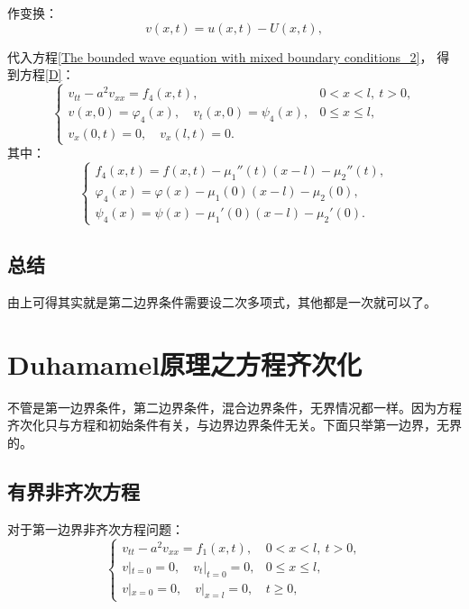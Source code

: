 \documentclass[12pt,a4paper]{article}
\numberwithin{subsection}{section}
\numberwithin{subsubsection}{subsection}
\theoremstyle{plain}
\theoremstyle{definition}
\theoremstyle{remark}
\begin{document}
	作变换：
	\begin{equation}
		v(x, t) = u(x, t) - U(x, t),
	\end{equation}
	
	代入方程\eqref{The bounded wave equation with mixed boundary conditions_2}，
	得到方程\eqref{D}：
	\begin{equation}\label{D}
		\begin{cases}
			v_{tt} - a^2 v_{xx} = f_4(x, t), & 0 < x < l, \ t > 0, \\
			v(x, 0) = \varphi_4(x), \quad v_t(x, 0) = \psi_4(x), & 0 \leq x \leq l, \\
			v_x(0, t) = 0, \quad v_x(l, t) = 0. &
		\end{cases}
	\end{equation}
	其中：
	\begin{equation}
		\begin{cases}
			f_4(x, t) = f(x, t) - \mu_1''(t) (x-l)- \mu_2''(t) , \\
			\varphi_4(x) = \varphi(x) - \mu_1(0)(x-l)- \mu_2(0), \\
			\psi_4(x) = \psi(x) - \mu_1'(0)(x-l) - \mu_2'(0).
		\end{cases}
	\end{equation}
	
	
	\subsection{总结}
	由上可得其实就是第二边界条件需要设二次多项式，其他都是一次就可以了。
	
	
	
		\newpage
	\section{Duhamamel原理之方程齐次化}
不管是第一边界条件，第二边界条件，混合边界条件，无界情况都一样。因为方程齐次化只与方程和初始条件有关，与边界边界条件无关。下面只举第一边界，无界的。
	
	
		\subsection{有界非齐次方程}

		
	对于第一边界非齐次方程问题：
	\begin{equation}
		\begin{cases}
			v_{tt} - a^2 v_{xx} = f_1(x, t), & 0 < x < l, \ t > 0, \\
			v|_{t=0} = 0, \quad v_t|_{t=0} = 0, & 0 \leq x \leq l, \\
			v|_{x=0} = 0, \quad v|_{x=l} = 0, & t \geq 0,
		\end{cases}
	\end{equation}
	
\end{document}
